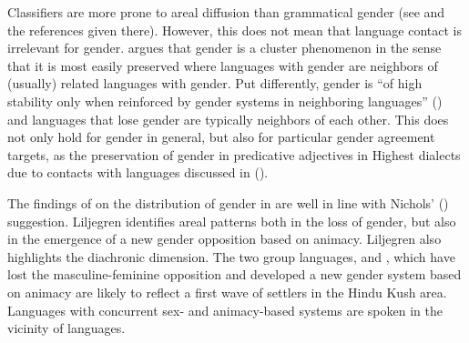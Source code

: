 \documentclass[output=collectionpaper]{langsci/langscibook}
\begin{document}
Classifiers are more prone to areal diffusion than grammatical gender (see \citealt[730--731]{Seifart2010} and the references given there). However, this does not mean that language contact is irrelevant for gender. \cite[300]{Nichols2003} argues that gender is a cluster phenomenon in the sense that it is most easily preserved where languages with gender are neighbors of (usually) related languages with gender. Put differently, gender is ``of high stability only when reinforced by gender systems in neighboring languages'' (\citealt[303]{Nichols2003}) and languages that lose gender are typically neighbors of each other. This does not only hold for gender in general, but also for particular gender agreement targets, as the preservation of gender in predicative adjectives in Highest   dialects due to contacts with  languages discussed in  (\citealt{Fleischer2007b}).

The findings of  on the distribution of gender in  are well in line with Nichols' (\citealt*{Nichols2003}) suggestion. Liljegren identifies areal patterns both in the loss of gender, but also in the emergence of a new gender opposition based on animacy. Liljegren also highlights the diachronic dimension. The two  group languages,  and , which have lost the  masculine-feminine opposition and developed a new gender system based on animacy are likely to reflect a first wave of  settlers in the Hindu Kush area. Languages with concurrent sex- and animacy-based systems are spoken in the vicinity of  languages.
\end{document}

